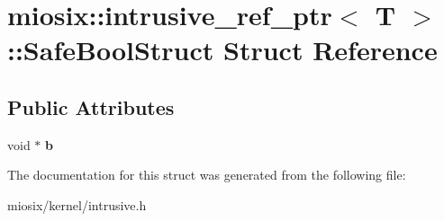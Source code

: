 \hypertarget{structmiosix_1_1intrusive__ref__ptr_1_1_safe_bool_struct}{\section{miosix\-:\-:intrusive\-\_\-ref\-\_\-ptr$<$ T $>$\-:\-:Safe\-Bool\-Struct Struct Reference}
\label{structmiosix_1_1intrusive__ref__ptr_1_1_safe_bool_struct}
}
\subsection*{Public Attributes}
\begin{DoxyCompactItemize}
\item 
\hypertarget{structmiosix_1_1intrusive__ref__ptr_1_1_safe_bool_struct_a180b3195b0e94870802c4965b41f2d86}{void $\ast$ {\bfseries b}}\label{structmiosix_1_1intrusive__ref__ptr_1_1_safe_bool_struct_a180b3195b0e94870802c4965b41f2d86}

\end{DoxyCompactItemize}


The documentation for this struct was generated from the following file\-:\begin{DoxyCompactItemize}
\item 
miosix/kernel/intrusive.\-h\end{DoxyCompactItemize}

